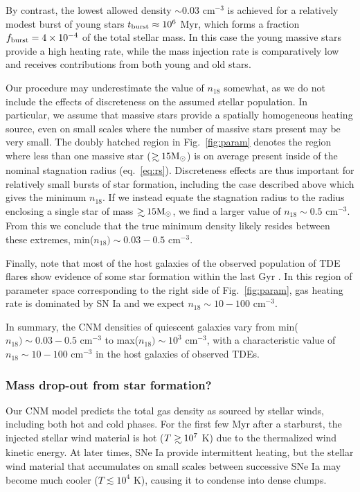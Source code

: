 \documentclass[usenatbib,fleqn]{mnras}
\newcommand\gsim{\mathrel{\rlap{\lower4pt\hbox{\hskip1pt$\sim$}}
    \raise1pt\hbox{$>$}}}
\newcommand{\Msun}{{\rm M_\odot}}
\begin{document}
By contrast, the lowest allowed density $\sim 0.03$ cm$^{-3}$ is
achieved for a relatively modest burst of young stars $t_{\rm burst}
\approx 10^{6}$ Myr, which forms a fraction $f_{\rm burst} = 4\times
10^{-4}$ of the total stellar mass. In this case the young massive
stars provide a high heating rate, while the mass injection rate is
comparatively low and receives contributions from both young and old
stars.

Our procedure may underestimate the value of $n_{18}$ somewhat, as we
do not include the effects of discreteness on the assumed stellar
population.  In particular, we assume that massive stars provide a
spatially homogeneous heating source, even on small scales where the
number of massive stars present may be very small.  The doubly hatched
region in Fig.~\ref{fig:param} denotes the region where less than one
massive star ($\gsim 15 \Msun$) is on average present inside of the
nominal stagnation radius (eq.~\ref{eq:rs}).  Discreteness effects are
thus important for relatively small bursts of star formation,
including the case described above which gives the minimum $n_{18}$.
If we instead equate the stagnation radius to the radius enclosing a
single star of mass $\gsim 15 \Msun$, we find a larger value of
$n_{18}\sim 0.5$ cm$^{-3}$.  From this we conclude that the true
minimum density likely resides between these extremes, min($n_{18})
\sim 0.03-0.5$ cm$^{-3}$.

Finally, note that most of the host galaxies of the observed population of TDE flares show evidence of some
star formation within the last Gyr \citep{French+2016}.  In this
region of parameter space corresponding to the right side of
Fig.~\ref{fig:param}, gas heating rate is dominated by SN Ia and we
expect $n_{18}\sim 10-100$ cm$^{-3}$.

In summary, the CNM densities of quiescent galaxies vary from
min($n_{18}) \sim 0.03-0.5$ cm$^{-3}$ to max($n_{18})\sim 10^{3}$
cm$^{-3}$, with a characteristic value of $n_{18}\sim 10-100$
cm$^{-3}$ in the host galaxies of observed TDEs.

\subsubsection{Mass drop-out from star formation?}

Our CNM model predicts the total gas density as sourced by
stellar winds, including both hot and cold phases.  For the first few
Myr after a starburst, the injected stellar wind material is hot
($T\gsim 10^{7}$ K) due to the thermalized wind kinetic energy.
At later times, SNe Ia provide intermittent heating, but the stellar wind
material that accumulates on small scales between successive SNe Ia
may become much cooler ($T \lesssim 10^{4}$ K), causing it to condense into dense clumps.
\end{document}

